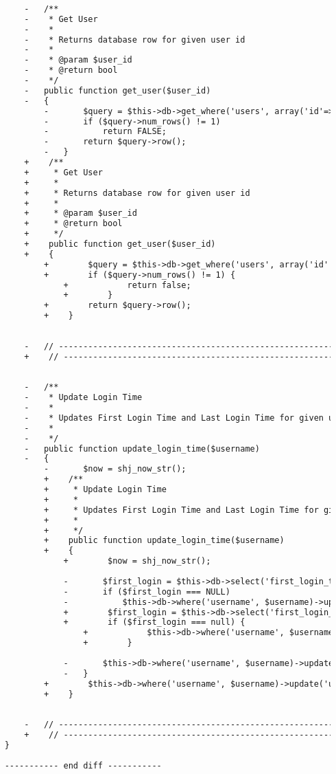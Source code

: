 \begin{lstlisting}[language=diff, caption=Perubahan pada kode User\_model.php]
		
		-	/**
		-	 * Get User
		-	 *
		-	 * Returns database row for given user id
		-	 *
		-	 * @param $user_id
		-	 * @return bool
		-	 */
		-	public function get_user($user_id)
		-	{
			-		$query = $this->db->get_where('users', array('id'=>$user_id));
			-		if ($query->num_rows() != 1)
			-			return FALSE;
			-		return $query->row();
			-	}
		+    /**
		+     * Get User
		+     *
		+     * Returns database row for given user id
		+     *
		+     * @param $user_id
		+     * @return bool
		+     */
		+    public function get_user($user_id)
		+    {
			+        $query = $this->db->get_where('users', array('id' => $user_id));
			+        if ($query->num_rows() != 1) {
				+            return false;
				+        }
			+        return $query->row();
			+    }
		
		
		-	// ------------------------------------------------------------------------
		+    // ------------------------------------------------------------------------
		
		
		-	/**
		-	 * Update Login Time
		-	 *
		-	 * Updates First Login Time and Last Login Time for given username
		-	 *
		-	 */
		-	public function update_login_time($username)
		-	{
			-		$now = shj_now_str();
			+    /**
			+     * Update Login Time
			+     *
			+     * Updates First Login Time and Last Login Time for given username
			+     *
			+     */
			+    public function update_login_time($username)
			+    {
				+        $now = shj_now_str();
				
				-		$first_login = $this->db->select('first_login_time')->get_where('users', array('username'=>$username))->row()->first_login_time;
				-		if ($first_login === NULL)
				-			$this->db->where('username', $username)->update('users', array('first_login_time'=>$now));
				+        $first_login = $this->db->select('first_login_time')->get_where('users', array('username' => $username))->row()->first_login_time;
				+        if ($first_login === null) {
					+            $this->db->where('username', $username)->update('users', array('first_login_time' => $now));
					+        }
				
				-		$this->db->where('username', $username)->update('users', array('last_login_time'=>$now));
				-	}
			+        $this->db->where('username', $username)->update('users', array('last_login_time' => $now));
			+    }
		
		
		-	// ------------------------------------------------------------------------
		+    // ------------------------------------------------------------------------
	}
	
	----------- end diff -----------
\end{lstlisting}

